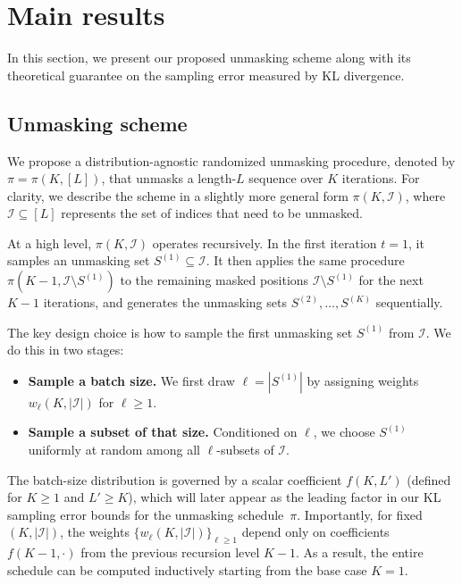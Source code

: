 \documentclass[english]{article}
\newcommand{\cI}{\mathcal{I}}
\begin{document}
\section{Main results}
\label{sec:results}

In this section, we present our proposed unmasking scheme along with its theoretical guarantee on the sampling error measured by KL divergence.

\subsection{Unmasking scheme}
We propose a distribution-agnostic randomized unmasking procedure, denoted by $\pi = \pi(K, [L])$, that unmasks a length-$L$ sequence over $K$ iterations. 
%
For clarity, we describe the scheme in a slightly more general form \(\pi(K,\cI)\), where \(\cI\subseteq[L]\) represents the set of indices that need to be unmasked.

At a high level, $\pi(K, \cI)$ operates recursively. In the first iteration $t=1$, it samples an unmasking set $S^{(1)}\subseteq \cI$. It then applies the same procedure $\pi(K-1, \cI \setminus S^{(1)})$ to the remaining masked positions $\cI \setminus S^{(1)}$ for the next $K-1$ iterations, and generates the unmasking sets $S^{(2)}, \ldots, S^{(K)}$ sequentially.

The key design choice is how to sample the first unmasking set $S^{(1)}$ from $\cI$. We do this in two stages:
\begin{itemize}
    \item \textbf{Sample a batch size.} We first draw $\ell=|S^{(1)}|$ by assigning weights $w_\ell(K,|\cI|)$ for $\ell \geq 1$.
    \item \textbf{Sample a subset of that size.} Conditioned on $\ell$, we choose $S^{(1)}$ uniformly at random among all $\ell$-subsets of \(\cI\).
\end{itemize}

The batch-size distribution is governed by a scalar coefficient $f(K,L')$ (defined for $K \geq 1$ and $L' \geq K$), which will later appear as the leading factor in our KL sampling error bounds for the unmasking schedule~$\pi$.
%
%
Importantly, for fixed $(K,|\cI|)$, the weights $\{w_\ell(K,|\cI|)\}_{\ell \geq 1}$ depend only on coefficients $f(K-1,\cdot)$ from the previous recursion level $K-1$. As a result, the entire schedule can be computed inductively starting from the base case $K=1$.
\end{document}
